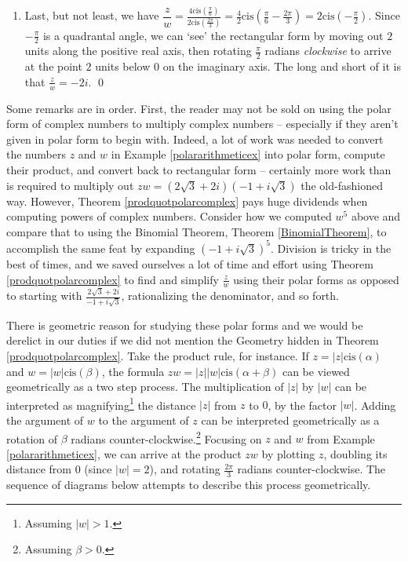 \begin{ex}
\begin{enumerate}
\item  Last, but not least, we have $\dfrac{z}{w} = \frac{4 \text{cis}\left(\frac{\pi}{6}\right)}{2\text{cis}\left(\frac{2\pi}{3}\right)} = \frac{4}{2} \text{cis}\left(\frac{\pi}{6} - \frac{2\pi}{3}\right) = 2\text{cis}\left(-\frac{\pi}{2}\right)$.  Since $-\frac{\pi}{2}$ is a quadrantal angle, we can `see' the rectangular form by moving out $2$ units along the positive real axis, then rotating $\frac{\pi}{2}$ radians \textit{clockwise} to arrive at the point $2$ units below $0$ on the imaginary axis.  The long and short of it is that $\frac{z}{w} = -2i$. \qed

\end{enumerate}

\end{ex}

Some remarks are in order.  First, the reader may not be sold on using the polar form of complex numbers to multiply complex numbers -- especially if they aren't given in polar form to begin with. Indeed, a lot of work was needed to convert the numbers $z$ and $w$ in Example \ref{polararithmeticex} into polar form, compute their product, and convert back to rectangular form -- certainly more work than is required to multiply out $zw =  (2\sqrt{3} + 2i)(-1 + i\sqrt{3})$ the old-fashioned way.  However, Theorem \ref{prodquotpolarcomplex} pays huge dividends when computing powers of complex numbers.  Consider how we computed $w^{5}$ above and compare that to using the Binomial Theorem, Theorem \ref{BinomialTheorem}, to accomplish the same feat by expanding  $(-1 + i\sqrt{3})^{5}$.  Division is tricky in the best of times, and we saved ourselves a lot of time and effort using Theorem \ref{prodquotpolarcomplex} to find and simplify $\frac{z}{w}$ using their polar forms as opposed to starting with $\frac{2\sqrt{3} + 2i}{-1 + i\sqrt{3}}$, rationalizing the denominator, and so forth.    

\smallskip

There is geometric reason for studying these polar forms and we would be derelict in our duties if we did not mention the Geometry hidden in Theorem \ref{prodquotpolarcomplex}.  Take the product rule, for instance. If $z = |z| \text{cis}(\alpha)$ and $w = |w| \text{cis}(\beta)$, the formula $zw = |z||w| \text{cis}(\alpha + \beta)$ can be viewed geometrically as a two step process.  The multiplication of $|z|$ by $|w|$ can be interpreted as magnifying\footnote{Assuming $|w| > 1$.} the distance $|z|$ from $z$ to $0$, by the factor $|w|$. Adding the argument of $w$ to the argument of $z$ can be interpreted geometrically as a rotation of $\beta$ radians counter-clockwise.\footnote{Assuming $\beta > 0$.}  Focusing on $z$ and $w$ from Example \ref{polararithmeticex}, we can arrive at the product $zw$ by plotting $z$, doubling its distance from $0$ (since $|w| = 2$), and rotating $\frac{2\pi}{3}$ radians counter-clockwise. The sequence of diagrams below attempts to describe this process geometrically.

